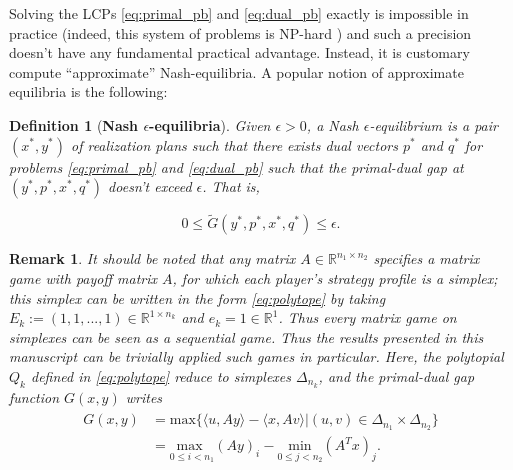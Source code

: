 \documentclass[a4paper,9pt]{extarticle}
\newtheorem{definition}{Definition}
\newtheorem{remark}{Remark}
\begin{document}
Solving the LCPs \eqref{eq:primal_pb} and \eqref{eq:dual_pb} exactly
is impossible in practice (indeed, this system of problems is NP-hard
\cite{koller1992complexity}) and such a precision doesn't have any
fundamental practical advantage. Instead, it is customary compute
``approximate'' Nash-equilibria. A popular notion of approximate
equilibria is the following:

\begin{definition}[\textbf{Nash $\epsilon$-equilibria}]
Given $\epsilon > 0$, a Nash $\epsilon$-equilibrium is
a pair $(x^*, y^*)$ of realization plans such that there exists dual
vectors $p^*$ and $q^*$ for problems \eqref{eq:primal_pb} and
\eqref{eq:dual_pb} such that the primal-dual gap at $(y^*, p^*, x^*, q^*)$
doesn't exceed $\epsilon$. That is,

\begin{equation}
  0 \le \tilde{G}(y^*, p^*, x^*, q^*) \le \epsilon.
\label{eq:approx_pb}
\end{equation}
\label{thm:approx_nash}
\end{definition}

\begin{remark}
It should be noted
that any matrix $A \in \mathbb{R}^{n_1 \times n_2}$ specifies a matrix
  game with payoff matrix $A$, for which each player's strategy
profile is a simplex; this simplex can be written in the form
\eqref{eq:polytope} by taking $E_k := (1, 1, ..., 1) \in
\mathbb{R}^{1 \times n_k}$ and $e_k = 1 \in \mathbb{R}^1$. Thus every
matrix game on simplexes can be seen as a sequential game.  Thus the
results presented in this manuscript can be trivially applied such
games in particular. Here, the polytopial $Q_k$
defined in \eqref{eq:polytope} reduce to simplexes $\Delta_{n_k}$,
and the primal-dual gap function $G(x,y)$ writes
\begin{eqnarray}
\begin{split}
G(x, y) &=
\mathrm{max}\{\langle u, Ay\rangle - \langle x, Av\rangle | (u,v) \in
\Delta_{n_1} \times \Delta_{n_2}\}\\
&= \underset{0 \le i <
  n_1}{\text{max }}(Ay)_i - \underset{0 \le j < n_2}{\text{min
}}(A^Tx)_j.
\end{split}
\label{eq:mg_pd}
\end{eqnarray}
\end{remark}
\end{document}
